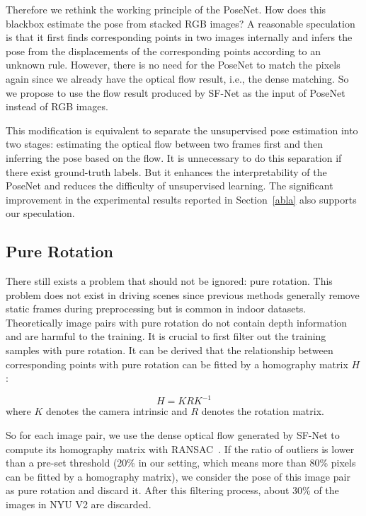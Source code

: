 \documentclass[10pt,twocolumn,letterpaper]{article}
\begin{document}
Therefore we rethink the working principle of the PoseNet. How does this blackbox estimate the pose from stacked RGB images? A reasonable speculation is that it first finds corresponding points in two images internally and infers the pose from the displacements of the corresponding points according to an unknown rule. However, there is no need for the PoseNet to match the pixels again since we already have the optical flow result, i.e., the dense matching. So we propose to use the flow result produced by SF-Net as the input of PoseNet instead of RGB images. 

This modification is equivalent to separate the unsupervised pose estimation into two stages: estimating the optical flow between two frames first and then inferring the pose based on the flow. It is unnecessary to do this separation if there exist ground-truth labels. But it enhances the interpretability of the PoseNet and reduces the difficulty of unsupervised learning. The significant improvement in the experimental results reported in Section~\ref{abla} also supports our speculation.

\subsection{Pure Rotation}
\label{sec:pure}
There still exists a problem that should not be ignored: pure rotation. This problem does not exist in driving scenes since previous methods generally remove static frames during preprocessing but is common in indoor datasets. Theoretically image pairs with pure rotation do not contain depth information and are harmful to the training. It is crucial to first filter out the training samples with pure rotation. It can be derived that the relationship between corresponding points with pure rotation can be fitted by a homography matrix $H$:

\begin{equation}
H=KRK^{-1}
\end{equation}
where $K$ denotes the camera intrinsic and $R$ denotes the rotation matrix. 

So for each image pair, we use the dense optical flow generated by SF-Net to compute its homography matrix with RANSAC~\cite{fischler1981random}. If the ratio of outliers is lower than a pre-set threshold (20\% in our setting, which means more than 80\% pixels can be fitted by a homography matrix), we consider the pose of this image pair as pure rotation and discard it. After this filtering process, about 30\% of the images in NYU V2 are discarded.
\end{document}
